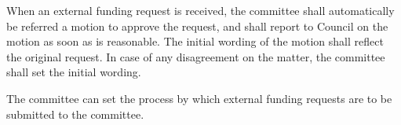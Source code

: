 When an external funding request is received, the committee shall automatically
be referred a motion to approve the request, and shall report to Council on the
motion as soon as is reasonable. The initial wording of the motion shall reflect
the original request. In case of any disagreement on the matter, the committee
shall set the initial wording.

The committee can set the process by which external funding requests are to be
submitted to the committee.
